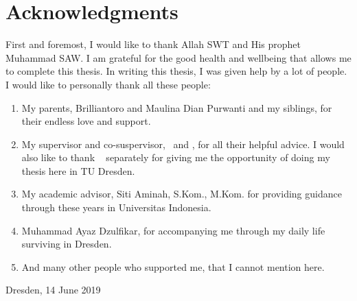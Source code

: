 \chapter*{Acknowledgments}

First and foremost, I would like to thank Allah SWT and His prophet Muhammad SAW.
I am grateful for the good health and wellbeing that allows me to complete this thesis.
In writing this thesis, I was given help by a lot of people.
I would like to personally thank all these people:

\begin{enumerate}
    \item My parents, Brilliantoro and Maulina Dian Purwanti and my siblings, for their endless love and support.
    \item My supervisor and co-suspervisor, \pembimbing~and \pembimbingDua, for all their helpful advice. I would also like to thank \pembimbing~ separately for giving me the opportunity of doing my thesis here in TU Dresden.
    \item My academic advisor, Siti Aminah, S.Kom., M.Kom. for providing guidance through these years in Universitas Indonesia.
    \item Muhammad Ayaz Dzulfikar, for accompanying me through my daily life surviving in Dresden.
    \item And many other people who supported me, that I cannot mention here.
\end{enumerate}

\vspace*{0.1cm}
\begin{flushright}
Dresden, 14 June 2019\\[0.1cm]
\vspace*{1cm}
\penulis

\end{flushright}